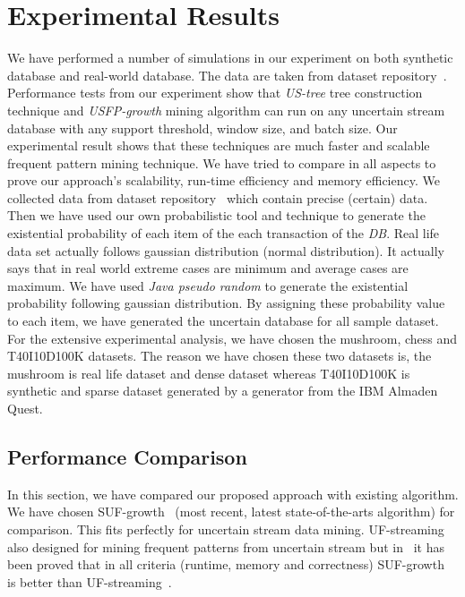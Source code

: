 \documentclass[conference]{IEEEtran}
\begin{document}
\section{Experimental Results}\label{Experiment}
We have performed a number of simulations in our experiment on both synthetic database and real-world database. The data are taken from dataset repository~\cite{dataset}. Performance tests from our experiment show that \emph{US-tree} tree construction technique and \emph{USFP-growth} mining algorithm can run on any uncertain stream database with any support threshold, window size, and batch size. Our experimental result shows that these techniques are much faster and scalable frequent pattern mining technique. We have tried to compare in all aspects to prove our approach's scalability, run-time efficiency and memory efficiency.  
We collected data from dataset repository~\cite{dataset} which contain precise (certain) data. Then we have used our own probabilistic tool and technique to generate the existential probability of each item of the each transaction of the \emph{DB}. Real life data set actually follows gaussian distribution (normal distribution). It actually says that in real world extreme cases are minimum and average cases are maximum. We have used \emph{Java pseudo random} to generate the existential probability following gaussian distribution. By assigning these probability value to each item, we have generated the uncertain database for all sample dataset. 
For the extensive experimental analysis, we have chosen the mushroom, chess and T40I10D100K datasets. The reason we have chosen these two datasets is, the mushroom  is real life dataset and dense dataset whereas T40I10D100K  is synthetic and sparse dataset generated by a generator from the IBM Almaden Quest.
\subsection{Performance Comparison}
In this section, we have compared our proposed approach with existing algorithm. We have chosen SUF-growth~\cite{DBLP:conf/icde/LeungH09} (most recent, latest state-of-the-arts algorithm) for comparison. This fits perfectly for uncertain stream data mining. UF-streaming also designed for mining frequent patterns from uncertain stream but in~\cite{DBLP:conf/icde/LeungH09} it has been proved that in all criteria (runtime, memory and correctness) SUF-growth~\cite{DBLP:conf/icde/LeungH09} is better than UF-streaming~\cite{DBLP:conf/icde/LeungH09}. 
\end{document}
